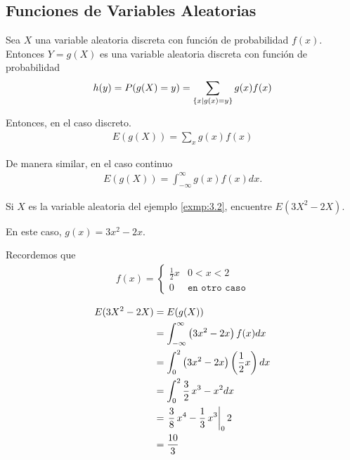 \subsection{Funciones de Variables Aleatorias}

 Sea $X$ una variable aleatoria discreta con función de probabilidad $f(x).$ Entonces $Y=g(X)$ es una variable aleatoria discreta con función de probabilidad
 \begin{align}
  h(y)=P(g(X)=y)=\sum_{\left\{ x|g(x)=y \right\}}g(x)f(x)
 \end{align}



 Entonces, en el caso discreto.
 \begin{align}
 \label{eq:3.5}
  E\left( g(X) \right)=
  \sum_{x}g(x)f(x)
 \end{align}

 De manera similar, en el caso continuo
 \begin{align}
  \label{eq:3.6}
  E\left( g(X) \right)=\int_{-\infty}^{\infty}
  g(x)f(x)dx.
 \end{align}




 \begin{ejemplo}
  \label{exmp:3.3}
  Si $X$ es la variable aleatoria del ejemplo \ref{exmp:3.2}, encuentre $E\left( 3X^{2}-2X \right).$
 \end{ejemplo}


{}
En este caso, $g(x)=3x^2-2x.$



Recordemos que
  \begin{align}
   f(x)=
   \begin{cases}
    \frac{1}{2}x & 0<x<2 \\
    0 & \texttt{en otro caso}
   \end{cases}
  \end{align}



\begin{align}
 E(3X^2-2X) &= E(g(X)) \\
  &= \displaystyle \int_{-\infty}^{\infty} \left( 3x^2-2x \right)f(x)dx\\
  &= \displaystyle \int_{0}^{2}\left( 3x^2-2x \right)\left( \dfrac{1}{2}x \right)dx \\
  &= \displaystyle \int_{0}^{2} \frac{3}{2} \, x^{3} - x^{2} dx
 \\  &= \displaystyle \left. \frac{3}{8} \, x^{4} - \frac{1}{3} \, x^{3}
 \right|_{0}{2}
\\  &= \displaystyle
\frac{10}{3}
\end{align}


